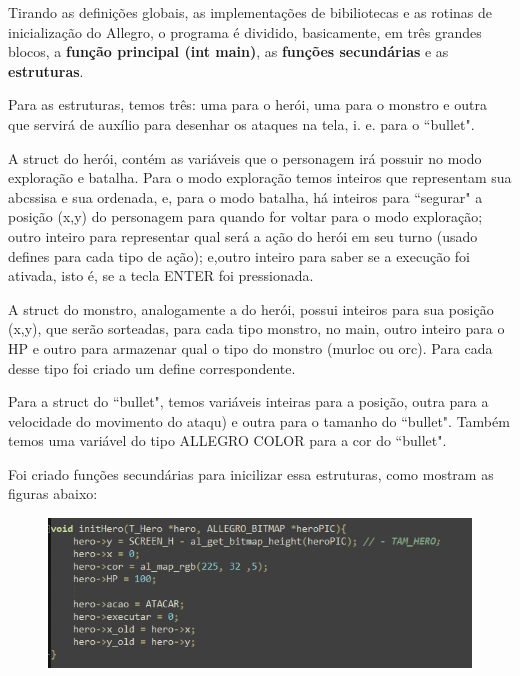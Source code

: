 \documentclass[a4paper, 12pt]{article}
\begin{document}
  Tirando as definições globais, as implementações de bibiliotecas e as rotinas de inicialização do Allegro, o programa é dividido, basicamente, em três grandes blocos, a \textbf{função principal (int main)}, as \textbf{funções secundárias} e as \textbf{estruturas}.
  
  Para as estruturas, temos três: uma para o herói, uma para o monstro e outra que servirá de auxílio para desenhar os ataques na tela, i. e. para o ``bullet". 
  
  A struct do herói, contém as variáveis que o personagem irá possuir no modo exploração e batalha. Para o modo exploração temos inteiros que representam sua abcssisa e sua ordenada, e, para o modo batalha, há inteiros para ``segurar" a posição (x,y) do personagem para quando for voltar para o modo exploração; outro inteiro para representar qual será a ação do herói em seu turno (usado defines para cada tipo de ação); e,outro inteiro para saber se a execução foi ativada, isto é, se a tecla ENTER foi pressionada.
  
  A struct do monstro, analogamente a do herói, possui inteiros para sua posição (x,y), que serão sorteadas, para cada tipo monstro, no main, outro inteiro para o HP  e outro para armazenar qual o tipo do monstro (murloc ou orc). Para cada desse tipo foi criado um define correspondente.
  
  Para a struct do ``bullet", temos variáveis inteiras para a posição, outra para a velocidade do movimento do ataqu) e outra para o tamanho do ``bullet". Também temos uma variável do tipo ALLEGRO COLOR para a cor do ``bullet".
  
  Foi criado funções secundárias para inicilizar essa estruturas, como mostram as figuras abaixo:
  
\begin{figure}[H]
\centering
\includegraphics[scale=0.6]{init_hero.png}
\label{label1}
\end{figure}
\end{document}
